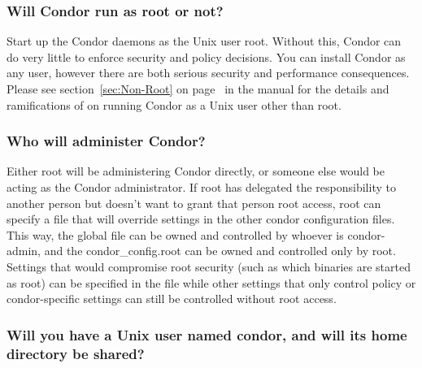 \subsubsection{Will Condor run as root or not?}

Start up the Condor daemons as the Unix user root.
Without this,
Condor can do very little to enforce security and policy
decisions.
You can install Condor as any user,
however there are both serious security and performance consequences.
Please see section~\ref{sec:Non-Root} on page~\pageref{sec:Non-Root}
in the manual for the details and ramifications of
on running Condor as a Unix user other than root.

\subsubsection{Who will administer Condor?}



Either root will be administering Condor directly, or someone else
would be acting as the Condor administrator.  If root has delegated
the responsibility to another person but doesn't want to grant that
person root access, root can specify a 
 file that
will override settings in the other condor configuration
files.  This way,
the global 
 file can be owned and controlled by whoever
is condor-admin, and the 
condor\_config.root can be owned and
controlled only by root.  Settings that would compromise root security
(such as which binaries are started as root) can be specified in the
 file while other settings that only control policy
or condor-specific settings can still be controlled without root
access.  

\subsubsection{Will you have a Unix user named condor, and will its home
directory be shared? }

